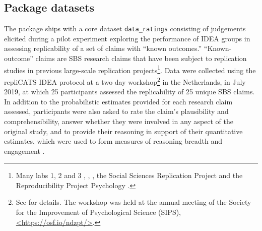 \documentclass[article]{jss}
\begin{document}
\hypertarget{package-datasets}{%
\subsection{Package datasets}\label{package-datasets}}

The  package ships with a core dataset
\texttt{data\_ratings} consisting of judgements elicited during a pilot
experiment exploring the performance of IDEA groups in assessing
replicability of a set of claims with ``known outcomes.''
``Known-outcome'' claims are SBS research claims that have been subject
to replication studies in previous large-scale replication
projects\footnote{Many labs 1, 2 and 3 \citet{Klein2014},
  \citet{Klein2018ManyL2}, \citet{Ebersole2016}, the Social Sciences
  Replication Project \citet{Camerer2018} and the Reproducibility
  Project Psychology \citet{aac4716}.}. Data were collected using the
repliCATS IDEA protocol at a two day workshop\footnote{See
  \citet{Hanea2021} for details. The workshop was held at the annual
  meeting of the Society for the Improvement of Psychological Science
  (SIPS),
  \href{https://osf.io/ndzpt/}{\textless https://osf.io/ndzpt/\textgreater{}}.}
in the Netherlands, in July 2019, at which 25 participants assessed the
replicability of 25 unique SBS claims. In addition to the probabilistic
estimates provided for each research claim assessed, participants were
also asked to rate the claim's plausibility and comprehensibility,
answer whether they were involved in any aspect of the original study,
and to provide their reasoning in support of their quantitative
estimates, which were used to form measures of reasoning breadth and
engagement \citep{Fraser:2021}.
\end{document}
